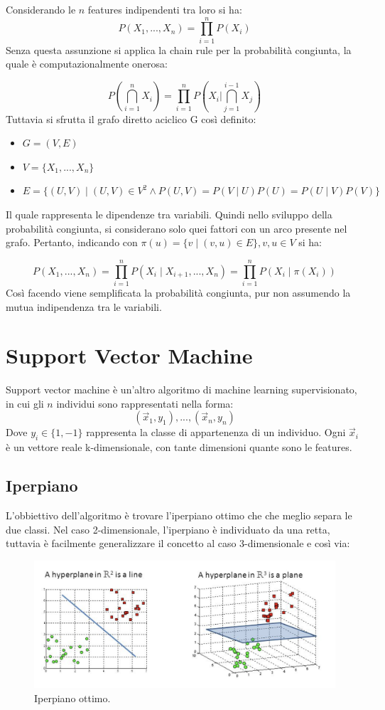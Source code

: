 \documentclass[oneside]{book}
\begin{document}
\noindent Considerando le $n$ features indipendenti tra loro si ha:
$$P(X_1, ..., X_n) = \prod\limits_{i=1}^{n}P(X_i) $$
Senza questa assunzione si applica la chain rule per la probabilità congiunta, la quale è computazionalmente onerosa:

\[ 
P \left( \bigcap_{i=1}^n X_i \right) = 
\prod\limits_{i=1}^{n}P
\left( X_i  \bigg\vert
\bigcap_{j=1}^{i-1} X_j \right)
\]
Tuttavia si sfrutta il grafo diretto aciclico G così definito:
\begin{itemize}
	\item $G = (V, E)$
	\item $V = \{X_1, ..., X_n\}$
	\item $E = \{(U,V) \mid (U,V) \in V^2 \land P(U, V) = P(V \mid U)P(U) = P(U \mid V)P(V) \}$
\end{itemize}
Il quale rappresenta le dipendenze tra variabili. Quindi nello sviluppo della probabilità congiunta, si considerano solo quei fattori con un arco presente nel grafo. Pertanto, indicando con $\pi(u) = \{v \mid (v, u) \in E\}, v,u \in V$ si ha:


$$P(X_1, ..., X_n) = \prod\limits_{i=1}^{n}P(X_i \mid X_{i+1}, ..., X_{n}) = \prod\limits_{i=1}^{n}P(X_i \mid \pi(X_i)) $$
Così facendo viene semplificata la probabilità congiunta, pur non assumendo la mutua indipendenza tra le variabili.

\newpage
\section{Support Vector Machine}
Support vector machine è un'altro algoritmo di machine learning supervisionato, in cui gli $n$ individui sono rappresentati nella forma:
$$(\vec{x}_1, y_1),...,(\vec{x}_n, y_n)$$
Dove $y_i \in \{1, -1\}$ rappresenta la classe di appartenenza di un individuo. Ogni $\vec{x}_i$ è un vettore reale k-dimensionale, con tante dimensioni quante sono le features.

\subsection{Iperpiano}
L'obbiettivo dell'algoritmo è trovare l'iperpiano ottimo che che meglio separa le due classi.
Nel caso 2-dimensionale, l'iperpiano è individuato da una retta, tuttavia è facilmente generalizzare il concetto al caso 3-dimensionale e così via:
\begin{figure}[H]
	\centering
	\includegraphics[width=12cm]{assets/svm-hyperplane.png}
	\caption[Caption for LOF]{Iperpiano ottimo.\footnotemark}
	\label{fig:svm-2d}
\end{figure}
\end{document}
